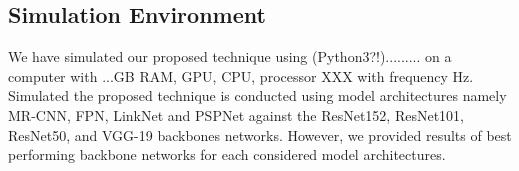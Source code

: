 \documentclass[a4paper,12pt]{spieman}  %
\begin{document}
\begin{spacing}{1}
\subsection{Simulation Environment}
We have simulated our proposed technique using (Python3?!)......... on a computer with ...GB RAM, GPU, CPU,  processor XXX with frequency Hz. Simulated the proposed technique is conducted using model architectures namely MR-CNN, FPN, LinkNet and PSPNet against the ResNet152, ResNet101, ResNet50, and VGG-19 backbones networks. However, we provided results of best performing backbone networks for each considered model architectures.

\end{spacing}
\end{document}

